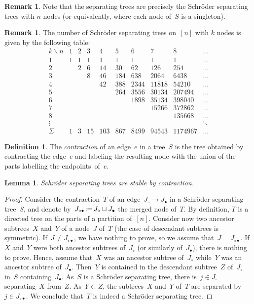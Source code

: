 \documentclass{amsart}
\newtheorem{lemma}[theorem]{Lemma}
\theoremstyle{definition}
\newtheorem{definition}[theorem]{Definition}
\newtheorem{remark}[theorem]{Remark}
\newcommand{\eqdef}{\mbox{\,\raisebox{0.2ex}{\scriptsize\ensuremath{\mathrm:}}\ensuremath{=}\,}} %
\newcommand{\darkblue}{\color{darkblue}} %
\newcommand{\defn}[1]{\textsl{\darkblue #1}} %
\begin{document}
\begin{remark}
Note that the separating trees are precisely the Schröder separating trees with $n$ nodes (or equivalently, where each node of~$S$ is a singleton).
\end{remark}

\begin{remark}
The number of Schröder separating trees on~$[n]$ with $k$ nodes is given by the following table:
\[
\begin{array}{c|cccccccccc}
k \backslash n & 1 & 2 & 3 & 4 & 5 & 6 & 7 & 8 & \dots \\
\hline
1 & 1 & 1 & 1 & 1 & 1 & 1 & 1 & 1 & \dots\\
2 & & 2 & 6 & 14 & 30 & 62 & 126 & 254 & \dots \\
3 & & & 8 & 46 & 184 & 638 & 2064 & 6438 & \dots\\
4 & & & & 42 & 388 & 2344 & 11818 & 54210 & \dots\\
5 & & & & & 264 & 3556 & 30134 & 207494 & \dots\\
6 & & & & & & 1898 & 35134 & 398040 & \dots\\ 
7 & & & & & & & 15266 & 372862 & \dots\\ 
8 & & & & & & & & 135668 & \dots \\
\vdots & & & & & & & & & \ddots \\
\hline
\Sigma & 1 & 3 & 15 & 103 & 867 & 8499 & 94543 & 1174967 & \dots
\end{array}
\]
\end{remark}

\begin{definition}
The \defn{contraction} of an edge~$e$ in a tree~$S$ is the tree obtained by contracting the edge~$e$ and labeling the resulting node with the union of the parts labelling the endpoints~of~$e$.
\end{definition}

\begin{lemma}
\label{lem:contractionSchroderSeparatingTree}
Schröder separating trees are stable by contraction.
\end{lemma}

\begin{proof}
Consider the contraction~$T$ of an edge~$J_\circ \to J_\bullet$ in a Schröder separating tree~$S$, and denote by~$J_{\circ\bullet} \eqdef J_\circ \sqcup J_\bullet$ the merged node of~$T$.
By definition, $T$ is a directed tree on the parts of a partition of~$[n]$.
Consider now two ancestor subtrees~$X$ and~$Y$ of a node~$J$ of~$T$ (the case of descendant subtrees is symmetric).
If~$J \ne J_{\circ\bullet}$, we have nothing to prove, so we assume that~$J = J_{\circ\bullet}$.
If~$X$ and~$Y$ were both ancestor subtrees of~$J_\circ$ (or similarly of~$J_\bullet$), there is nothing to prove.
Hence, assume that~$X$ was an ancestor subtree of~$J_\circ$ while~$Y$ was an ancestor subtree of~$J_\bullet$.
Then~$Y$ is contained in the descendant subtree~$Z$ of~$J_\circ$ in~$S$ containing~$J_\bullet$.
As~$S$ is a Schröder separating tree, there is~$j \in J_\circ$ separating~$X$ from~$Z$.
As~$Y \subset Z$, the subtrees~$X$ and~$Y$ of~$T$ are separated by~$j \in J_{\circ\bullet}$.
We conclude that~$T$ is indeed a Schröder separating tree.
\end{proof}
\end{document}
